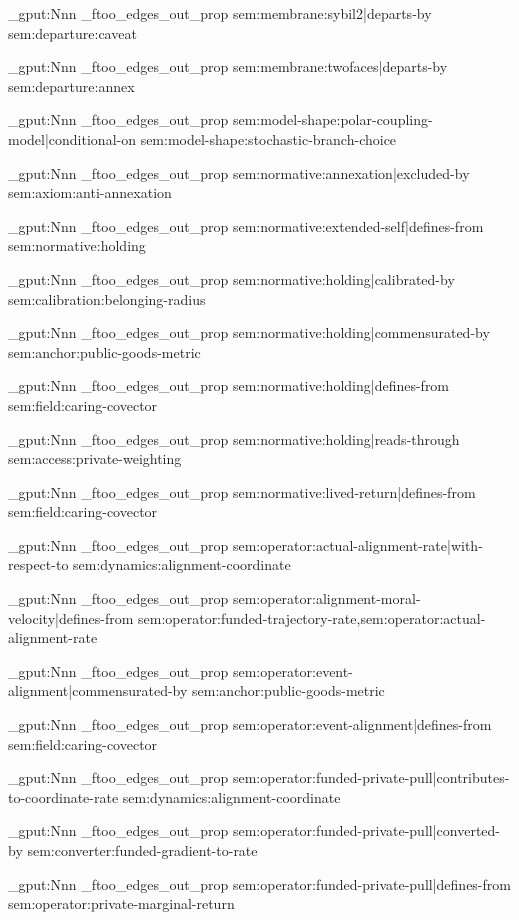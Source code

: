 \prop_gput:Nnn \g_ftoo_edges_out_prop { sem:membrane:sybil2|departs-by } { sem:departure:caveat }

\prop_gput:Nnn \g_ftoo_edges_out_prop { sem:membrane:twofaces|departs-by } { sem:departure:annex }

\prop_gput:Nnn \g_ftoo_edges_out_prop { sem:model-shape:polar-coupling-model|conditional-on } { sem:model-shape:stochastic-branch-choice }

\prop_gput:Nnn \g_ftoo_edges_out_prop { sem:normative:annexation|excluded-by } { sem:axiom:anti-annexation }

\prop_gput:Nnn \g_ftoo_edges_out_prop { sem:normative:extended-self|defines-from } { sem:normative:holding }

\prop_gput:Nnn \g_ftoo_edges_out_prop { sem:normative:holding|calibrated-by } { sem:calibration:belonging-radius }

\prop_gput:Nnn \g_ftoo_edges_out_prop { sem:normative:holding|commensurated-by } { sem:anchor:public-goods-metric }

\prop_gput:Nnn \g_ftoo_edges_out_prop { sem:normative:holding|defines-from } { sem:field:caring-covector }

\prop_gput:Nnn \g_ftoo_edges_out_prop { sem:normative:holding|reads-through } { sem:access:private-weighting }

\prop_gput:Nnn \g_ftoo_edges_out_prop { sem:normative:lived-return|defines-from } { sem:field:caring-covector }

\prop_gput:Nnn \g_ftoo_edges_out_prop { sem:operator:actual-alignment-rate|with-respect-to } { sem:dynamics:alignment-coordinate }

\prop_gput:Nnn \g_ftoo_edges_out_prop { sem:operator:alignment-moral-velocity|defines-from } { sem:operator:funded-trajectory-rate,sem:operator:actual-alignment-rate }

\prop_gput:Nnn \g_ftoo_edges_out_prop { sem:operator:event-alignment|commensurated-by } { sem:anchor:public-goods-metric }

\prop_gput:Nnn \g_ftoo_edges_out_prop { sem:operator:event-alignment|defines-from } { sem:field:caring-covector }

\prop_gput:Nnn \g_ftoo_edges_out_prop { sem:operator:funded-private-pull|contributes-to-coordinate-rate } { sem:dynamics:alignment-coordinate }

\prop_gput:Nnn \g_ftoo_edges_out_prop { sem:operator:funded-private-pull|converted-by } { sem:converter:funded-gradient-to-rate }

\prop_gput:Nnn \g_ftoo_edges_out_prop { sem:operator:funded-private-pull|defines-from } { sem:operator:private-marginal-return }

